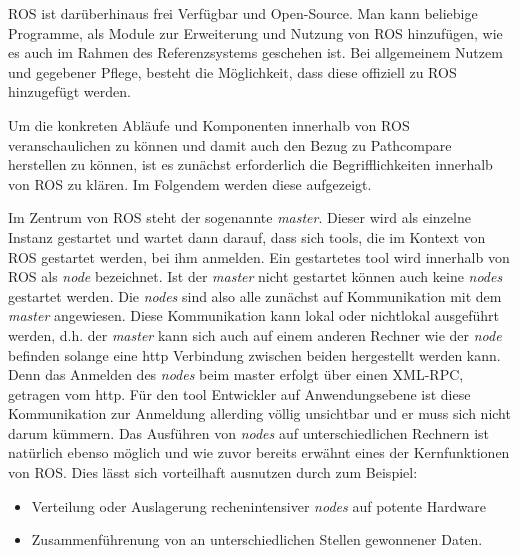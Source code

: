 
\gls{ROS} ist darüberhinaus frei Verfügbar und Open-Source. Man kann beliebige
Programme, als Module zur Erweiterung und Nutzung von \gls{ROS} hinzufügen, wie
es auch im Rahmen des Referenzsystems geschehen ist. Bei allgemeinem Nutzem und gegebener
Pflege, besteht die Möglichkeit, dass diese offiziell zu ROS hinzugefügt werden.

Um die konkreten Abläufe und Komponenten innerhalb von \gls{ROS} 
veranschaulichen zu können und damit auch den Bezug zu Pathcompare herstellen
zu können, ist es zunächst erforderlich die Begrifflichkeiten innerhalb von
\gls{ROS} zu klären. Im Folgendem werden diese aufgezeigt.

Im Zentrum von ROS steht der sogenannte \textit{master}. Dieser wird als
einzelne Instanz gestartet und wartet dann darauf, dass sich tools, die im
Kontext von \gls{ROS} gestartet werden, bei ihm anmelden. Ein
gestartetes tool wird innerhalb von \gls{ROS} als \textit{node} bezeichnet. 
Ist der \textit{master} nicht gestartet können auch keine \textit{nodes}
gestartet werden. Die \textit{nodes} sind also alle zunächst auf Kommunikation mit dem \textit{master}
angewiesen. Diese Kommunikation kann lokal oder nichtlokal ausgeführt werden,
d.h. der \textit{master} kann sich auch auf einem anderen Rechner wie der
\textit{node} befinden solange eine http Verbindung zwischen beiden hergestellt
werden kann. Denn das Anmelden des \textit{nodes} beim master erfolgt über einen
\gls{XML-RPC}, getragen vom http. Für den tool Entwickler auf Anwendungsebene ist diese
Kommunikation zur Anmeldung allerding völlig unsichtbar und er muss sich nicht darum kümmern.
Das Ausführen von \textit{nodes} auf unterschiedlichen Rechnern ist natürlich ebenso
möglich und wie zuvor bereits erwähnt eines der Kernfunktionen von \gls{ROS}.
Dies lässt sich vorteilhaft ausnutzen durch zum Beispiel:
\begin{itemize}
  \item Verteilung oder Auslagerung rechenintensiver \textit{nodes} auf potente Hardware
  \item Zusammenführenung von an unterschiedlichen Stellen gewonnener Daten.
\end{itemize}

